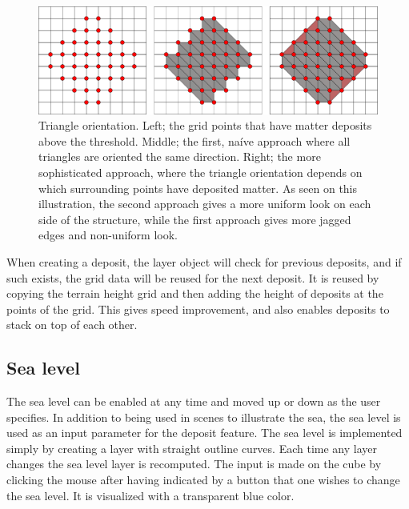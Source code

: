 \documentclass[a4paper,12pt]{report}
\begin{document}
\begin{figure}
 \includegraphics[width=\linewidth]{thesis/gridtrianglesall.pdf}
 \caption{Triangle orientation. Left; the grid points that have matter deposits above the threshold. Middle; the first, naíve approach where all triangles are oriented the same direction. Right; the more sophisticated approach, where the triangle orientation depends on which surrounding points have deposited matter. As seen on this illustration, the second approach gives a more uniform look on each side of the structure, while the first approach gives more jagged edges and non-uniform look.}
 \label{fig:triangleOrient}
\end{figure}


When creating a deposit, the layer object will check for previous deposits, and if such exists, the grid data will be reused for the next deposit. It is reused by copying the terrain height grid and then adding the height of deposits at the points of the grid. This gives speed improvement, and also enables deposits to stack on top of each other.

\subsection{Sea level}
The sea level can be enabled at any time and moved up or down as the user specifies. In addition to being used in scenes to illustrate the sea, the sea level is used as an input parameter for the deposit feature. The sea level is implemented simply by creating a layer with straight outline curves. Each time any layer changes the sea level layer is recomputed. The input is made on the cube by clicking the mouse after having indicated by a button that one wishes to change the sea level. It is visualized with a transparent blue color.
\end{document}
